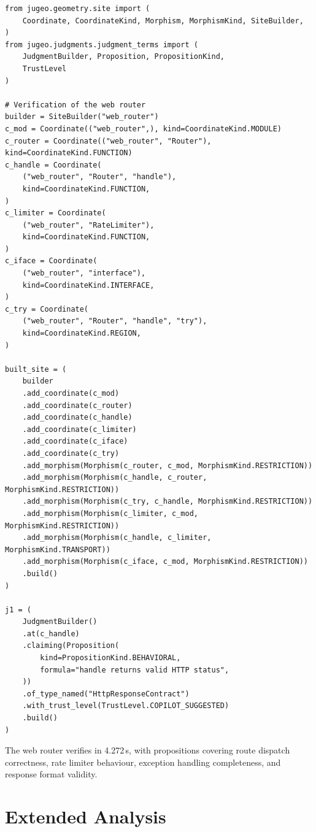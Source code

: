 \documentclass[11pt]{article}
\begin{document}
\begin{lstlisting}[style=jugeo-python,caption={Web router with route dispatch.}]
from jugeo.geometry.site import (
    Coordinate, CoordinateKind, Morphism, MorphismKind, SiteBuilder,
)
from jugeo.judgments.judgment_terms import (
    JudgmentBuilder, Proposition, PropositionKind,
    TrustLevel
)

# Verification of the web router
builder = SiteBuilder("web_router")
c_mod = Coordinate(("web_router",), kind=CoordinateKind.MODULE)
c_router = Coordinate(("web_router", "Router"), kind=CoordinateKind.FUNCTION)
c_handle = Coordinate(
    ("web_router", "Router", "handle"),
    kind=CoordinateKind.FUNCTION,
)
c_limiter = Coordinate(
    ("web_router", "RateLimiter"),
    kind=CoordinateKind.FUNCTION,
)
c_iface = Coordinate(
    ("web_router", "interface"),
    kind=CoordinateKind.INTERFACE,
)
c_try = Coordinate(
    ("web_router", "Router", "handle", "try"),
    kind=CoordinateKind.REGION,
)

built_site = (
    builder
    .add_coordinate(c_mod)
    .add_coordinate(c_router)
    .add_coordinate(c_handle)
    .add_coordinate(c_limiter)
    .add_coordinate(c_iface)
    .add_coordinate(c_try)
    .add_morphism(Morphism(c_router, c_mod, MorphismKind.RESTRICTION))
    .add_morphism(Morphism(c_handle, c_router, MorphismKind.RESTRICTION))
    .add_morphism(Morphism(c_try, c_handle, MorphismKind.RESTRICTION))
    .add_morphism(Morphism(c_limiter, c_mod, MorphismKind.RESTRICTION))
    .add_morphism(Morphism(c_handle, c_limiter, MorphismKind.TRANSPORT))
    .add_morphism(Morphism(c_iface, c_mod, MorphismKind.RESTRICTION))
    .build()
)

j1 = (
    JudgmentBuilder()
    .at(c_handle)
    .claiming(Proposition(
        kind=PropositionKind.BEHAVIORAL,
        formula="handle returns valid HTTP status",
    ))
    .of_type_named("HttpResponseContract")
    .with_trust_level(TrustLevel.COPILOT_SUGGESTED)
    .build()
)
\end{lstlisting}

The web router verifies in 4.272\,s, with propositions covering
route dispatch correctness, rate limiter behaviour, exception
handling completeness, and response format validity.

\section{Extended Analysis}\label{sec:extended}
\end{document}
